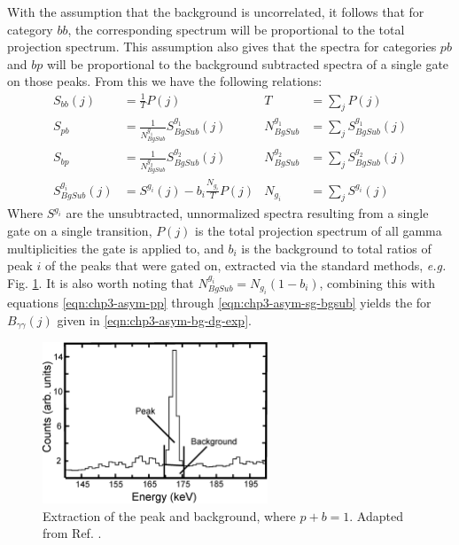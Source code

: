 With the assumption that the background is uncorrelated, it follows that for category $bb$, the corresponding spectrum will be proportional to the total projection spectrum. This assumption also gives that the spectra for categories $pb$ and $bp$ will be proportional to the background subtracted spectra of a single gate on those peaks. From this we have the following relations:
\begin{align}
S_{bb}(j) &=\frac{1}{T}P(j) & T &= \sum\limits_{j}^{}P(j) \label{eqn:chp3-asym-bb}\\
S_{pb} &= \frac{1}{N^{g_1}_{BgSub}}S^{g_1}_{BgSub}(j)  & N^{g_1}_{BgSub} &= \sum\limits_{j}^{}S^{g_1}_{BgSub}(j) \label{eqn:chp3-asym-bp}\\
S_{bp} &= \frac{1}{N^{g_2}_{BgSub}}S^{g_2}_{BgSub}(j)  & N^{g_2}_{BgSub} &= \sum\limits_{j}^{}S^{g_2}_{BgSub}(j) \label{eqn:chp3-asym-pb}\\
S^{g_i}_{BgSub}(j) &= S^{g_i}(j) - b_i \frac{N_{g_i}}{T}P(j) & N_{g_i} &=  \sum\limits_{j}^{}S^{g_i}(j)  \label{eqn:chp3-asym-sg-bgsub}
\end{align}
Where $S^{g_i}$ are the unsubtracted, unnormalized spectra resulting from a single gate on a single transition, $P(j)$ is the total projection spectrum of all gamma multiplicities the gate is applied to, and $b_i$ is the background to total ratios of peak $i$ of the peaks that were gated on, extracted via the standard methods, \emph{e.g.} Fig. \ref{fig:chp3-asym-bg-ratio}. It is also worth noting that $N^{g_i}_{BgSub} = N_{g_i}(1 - b_i)$, combining this with equations \ref{eqn:chp3-asym-pp} through \ref{eqn:chp3-asym-sg-bgsub} yields the for $B_{\gamma{}\gamma{}}(j)$ given in \ref{eqn:chp3-asym-bg-dg-exp}.

\begin{figure}[h!]
	\centerline{\includegraphics[width=0.6\textwidth]{./img/c3/peak_to_bg_asym_bg.eps}}
	\caption{Extraction of the peak and background, where $p + b = 1$. Adapted from Ref. \cite{asymBGSub}.}
	\label{fig:chp3-asym-bg-ratio}
\end{figure}

